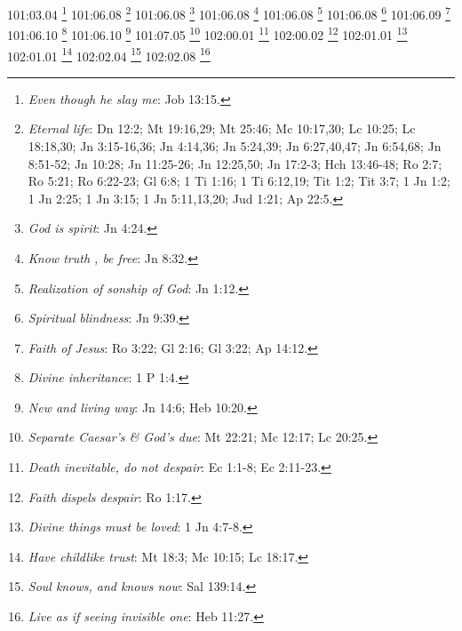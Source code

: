 101:03.04 \footnote{\textit{Even though he slay me}: Job 13:15.}
101:06.08 \footnote{\textit{Eternal life}: Dn 12:2; Mt 19:16,29; Mt 25:46; Mc 10:17,30; Lc 10:25; Lc 18:18,30; Jn 3:15-16,36; Jn 4:14,36; Jn 5:24,39; Jn 6:27,40,47; Jn 6:54,68; Jn 8:51-52; Jn 10:28; Jn 11:25-26; Jn 12:25,50; Jn 17:2-3; Hch 13:46-48; Ro 2:7; Ro 5:21; Ro 6:22-23; Gl 6:8; 1 Ti 1:16; 1 Ti 6:12,19; Tit 1:2; Tit 3:7; 1 Jn 1:2; 1 Jn 2:25; 1 Jn 3:15; 1 Jn 5:11,13,20; Jud 1:21; Ap 22:5.}
101:06.08 \footnote{\textit{God is spirit}: Jn 4:24.}
101:06.08 \footnote{\textit{Know truth , be free}: Jn 8:32.}
101:06.08 \footnote{\textit{Realization of sonship of God}: Jn 1:12.}
101:06.08 \footnote{\textit{Spiritual blindness}: Jn 9:39.}
101:06.09 \footnote{\textit{Faith of Jesus}: Ro 3:22; Gl 2:16; Gl 3:22; Ap 14:12.}
101:06.10 \footnote{\textit{Divine inheritance}: 1 P 1:4.}
101:06.10 \footnote{\textit{New and living way}: Jn 14:6; Heb 10:20.}
101:07.05 \footnote{\textit{Separate Caesar's & God's due}: Mt 22:21; Mc 12:17; Lc 20:25.}
102:00.01 \footnote{\textit{Death inevitable, do not despair}: Ec 1:1-8; Ec 2:11-23.}
102:00.02 \footnote{\textit{Faith dispels despair}: Ro 1:17.}
102:01.01 \footnote{\textit{Divine things must be loved}: 1 Jn 4:7-8.}
102:01.01 \footnote{\textit{Have childlike trust}: Mt 18:3; Mc 10:15; Lc 18:17.}
102:02.04 \footnote{\textit{Soul knows, and knows now}: Sal 139:14.}
102:02.08 \footnote{\textit{Live as if seeing invisible one}: Heb 11:27.}
